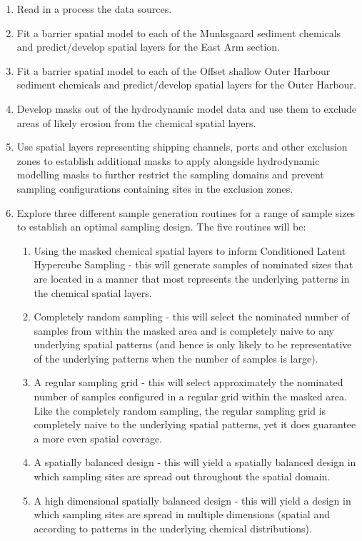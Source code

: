 \documentclass[a4paper]{article}
\begin{document}
\begin{enumerate}
\def\labelenumi{\arabic{enumi}.}
\tightlist
\item
  Read in a process the data sources.
\item
  Fit a barrier spatial model to each of the Munksgaard sediment
  chemicals and predict/develop spatial layers for the East Arm section.
\item
  Fit a barrier spatial model to each of the Offset shallow Outer
  Harbour sediment chemicals and predict/develop spatial layers for the
  Outer Harbour.
\item
  Develop masks out of the hydrodynamic model data and use them to
  exclude areas of likely erosion from the chemical spatial layers.
\item
  Use spatial layers representing shipping channels, ports and other
  exclusion zones to establish additional masks to apply alongside
  hydrodynamic modelling masks to further restrict the sampling domains
  and prevent sampling configurations containing sites in the exclusion
  zones.
\item
  Explore three different sample generation routines for a range of
  sample sizes to establish an optimal sampling design. The five
  routines will be:

  \begin{enumerate}
  \def\labelenumii{\alph{enumii})}
  \tightlist
  \item
    Using the masked chemical spatial layers to inform Conditioned
    Latent Hypercube Sampling - this will generate samples of nominated
    sizes that are located in a manner that most represents the
    underlying patterns in the chemical spatial layers.
  \item
    Completely random sampling - this will select the nominated number
    of samples from within the masked area and is completely naive to
    any underlying spatial patterns (and hence is only likely to be
    representative of the underlying patterns when the number of samples
    is large).
  \item
    A regular sampling grid - this will select approximately the
    nominated number of samples configured in a regular grid within the
    masked area. Like the completely random sampling, the regular
    sampling grid is completely naive to the underlying spatial
    patterns, yet it does guarantee a more even spatial coverage.
  \item
    A spatially balanced design - this will yield a spatially balanced
    design in which sampling sites are spread out throughout the spatial
    domain.
  \item
    A high dimensional spatially balanced design - this will yield a
    design in which sampling sites are spread in multiple dimensions
    (spatial and according to patterns in the underlying chemical
    distributions).
  \end{enumerate}
\end{enumerate}
\end{document}
